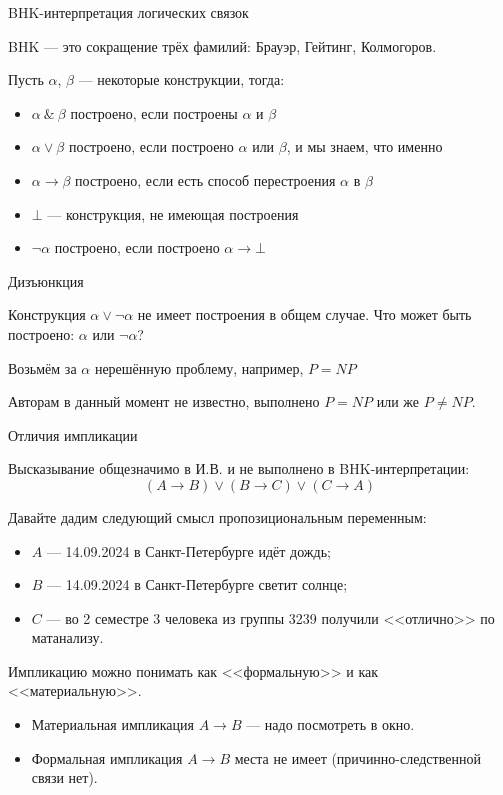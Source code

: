 \documentclass[aspectratio=169]{beamer}
\begin{document}
\begin{frame}{BHK-интерпретация логических связок}

BHK — это сокращение трёх фамилий: Брауэр, Гейтинг, Колмогоров. \pause

\vspace{1cm}

Пусть $\alpha$, $\beta$ --- некоторые конструкции, тогда:\pause

\begin{itemize}
\item $\alpha\ \&\ \beta$ построено, если построены $\alpha$ и $\beta$ \pause
\item $\alpha \vee \beta$ построено, если построено $\alpha$ или $\beta$,
и мы знаем, что именно \pause
\item $\alpha\rightarrow\beta$ построено, если есть способ перестроения
$\alpha$ в $\beta$\pause
\item $\bot$ — конструкция, не имеющая построения\pause
\item $\neg\alpha$ построено, если построено $\alpha\rightarrow\bot$
\end{itemize}
\end{frame}

\begin{frame}{Дизъюнкция}

Конструкция $\alpha\vee\neg\alpha$ не имеет построения в общем случае.
Что может быть построено: $\alpha$ или $\neg\alpha$?\pause

\vspace{1cm}

Возьмём за $\alpha$ нерешённую проблему, например, $P = NP$\pause
\vspace{1cm}

Авторам в данный момент не известно, выполнено $P = NP$ или же $P \ne NP$.
\end{frame}

\begin{frame}{Отличия импликации}

Высказывание общезначимо в И.В. и не выполнено в BHK-интерпретации:
$$(A \rightarrow B) \vee (B \rightarrow C) \vee (C \rightarrow A)$$\pause

Давайте дадим следующий смысл пропозициональным переменным:
\begin{itemize}
\item $A$ --- 14.09.2024 в Санкт-Петербурге идёт дождь;
\item $B$ --- 14.09.2024 в Санкт-Петербурге светит солнце;
\item $C$ --- во 2 семестре 3 человека из группы 3239 получили <<отлично>> по матанализу.
\end{itemize}\pause

Импликацию можно понимать как <<формальную>> и как <<материальную>>.
\begin{itemize}
\item Материальная импликация $A\rightarrow B$ --- надо посмотреть в окно.\pause

\item Формальная импликация $A\rightarrow B$ места не имеет (причинно-следственной связи нет).
\end{itemize}

\end{frame}
\end{document}

